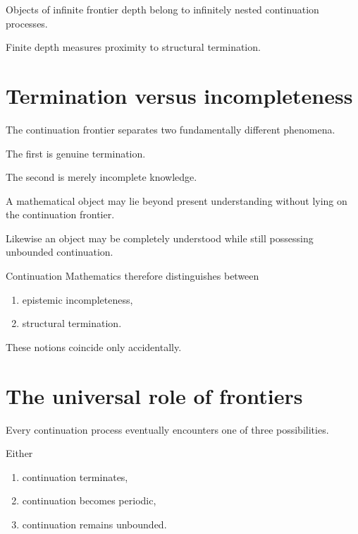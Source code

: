 \documentclass[13pt,openany]{book}
\theoremstyle{plain}
\theoremstyle{definition}
\begin{document}
Objects of infinite frontier depth belong to infinitely nested continuation
processes.

Finite depth measures proximity to structural termination.


\section{Termination versus incompleteness}

The continuation frontier separates two fundamentally different phenomena.

The first is genuine termination.

The second is merely incomplete knowledge.

A mathematical object may lie beyond present understanding without lying on
the continuation frontier.

Likewise an object may be completely understood while still possessing
unbounded continuation.

Continuation Mathematics therefore distinguishes between

\begin{enumerate}

\item epistemic incompleteness,

\item structural termination.

\end{enumerate}

These notions coincide only accidentally.


\section{The universal role of frontiers}

Every continuation process eventually encounters one of three possibilities.

Either

\begin{enumerate}

\item continuation terminates,

\item continuation becomes periodic,

\item continuation remains unbounded.

\end{enumerate}
\end{document}
